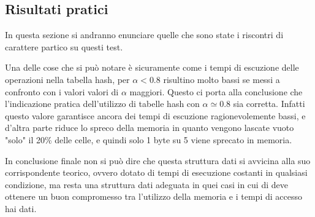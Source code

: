 \documentclass{article}
\begin{document}
\subsection{Risultati pratici}
In questa sezione si andranno enunciare quelle che sono state i riscontri di carattere partico su questi test.

Una delle cose che si può notare è sicuramente come i tempi di escuzione delle operazioni nella tabella hash, per $\alpha < 0.8$ risultino molto bassi se messi a confronto con i valori valori di $\alpha$ maggiori. Questo ci porta alla conclusione che l'indicazione pratica dell'utilizzo di tabelle hash con $\alpha \simeq 0.8$ sia corretta. Infatti questo valore garantisce ancora dei tempi di escuzione ragionevolemente bassi, e d'altra parte riduce lo spreco della memoria in quanto vengono lascate vuoto "solo" il 20\% delle celle, e quindi solo 1 byte su 5 viene sprecato in memoria.

In conclusione finale non si può dire che questa struttura dati si avvicina alla suo corrispondente teorico, ovvero dotato di tempi di esecuzione costanti in qualsiasi condizione, ma resta una struttura dati adeguata in quei casi in cui di deve ottenere un buon compromesso tra l'utilizzo della memoria e i tempi di accesso hai dati.

\newpage

\listoffigures
\listoftables
\end{document}
